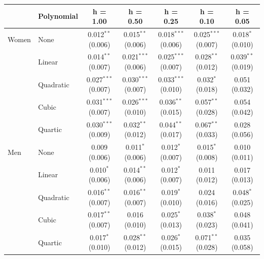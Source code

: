 
\begin{tabular}{llccccc}
\toprule
 & Polynomial & h = 1.00 & h = 0.50 & h = 0.25 & h = 0.10 & h = 0.05\\
\midrule
Women & None & 0.012$^{**}$ (0.006) & 0.015$^{**}$ (0.006) & 0.018$^{***}$ (0.006) & 0.025$^{***}$ (0.007) & 0.018$^{*}$ (0.010)\\
 & Linear & 0.014$^{**}$ (0.007) & 0.021$^{***}$ (0.006) & 0.025$^{***}$ (0.007) & 0.028$^{**}$ (0.012) & 0.039$^{**}$ (0.019)\\
 & Quadratic & 0.027$^{***}$ (0.007) & 0.030$^{***}$ (0.007) & 0.033$^{***}$ (0.010) & 0.032$^{*}$ (0.018) & 0.051 (0.032)\\
 & Cubic & 0.031$^{***}$ (0.007) & 0.026$^{***}$ (0.010) & 0.036$^{**}$ (0.015) & 0.057$^{**}$ (0.028) & 0.054 (0.042)\\
 & Quartic & 0.030$^{***}$ (0.009) & 0.032$^{**}$ (0.012) & 0.044$^{**}$ (0.017) & 0.067$^{**}$ (0.033) & 0.028 (0.056)\\
\addlinespace
Men & None & 0.009 (0.006) & 0.011$^{*}$ (0.006) & 0.012$^{*}$ (0.007) & 0.015$^{*}$ (0.008) & 0.010 (0.011)\\
 & Linear & 0.010$^{*}$ (0.006) & 0.014$^{**}$ (0.006) & 0.012$^{*}$ (0.007) & 0.011 (0.012) & 0.017 (0.013)\\
 & Quadratic & 0.016$^{**}$ (0.007) & 0.016$^{**}$ (0.007) & 0.019$^{*}$ (0.010) & 0.024 (0.016) & 0.048$^{*}$ (0.025)\\
 & Cubic & 0.017$^{**}$ (0.007) & 0.016 (0.010) & 0.025$^{*}$ (0.013) & 0.038$^{*}$ (0.023) & 0.048 (0.041)\\
 & Quartic & 0.017$^{*}$ (0.010) & 0.028$^{**}$ (0.012) & 0.026$^{*}$ (0.015) & 0.071$^{**}$ (0.028) & 0.035 (0.058)\\
\bottomrule
\end{tabular}
